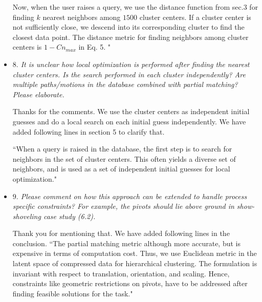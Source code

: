 \documentclass{article}
\begin{document}
\begin{itemize}
Now, when the user raises a query, we use the distance function from sec.3 for finding $k$ nearest neighbors among $1500$ cluster centers.
If a cluster center is not sufficiently close, we descend into its corresponding cluster to find the closest data point.
The distance metric for finding neighbors among cluster centers is $1-Cn_{max}$ in Eq. 5.  "
\\

  \item \emph{
$8.$ It is unclear how local optimization is performed after finding the nearest cluster centers. Is the
search performed in each cluster independently? Are multiple paths/motions in the database
combined with partial matching? Please elaborate.
}

Thanks for the comments.
We use the cluster centers as independent initial guesses and do a local search on each initial guess independently.
We have added following lines in section 5 to clarify that.

``When a query is raised in the database, the first step is to search for neighbors in the set of cluster centers.
This often yields a diverse set of neighbors, and is used as a set of independent initial guesses for local optimization."
\\


  \item \emph{
$9.$ Please comment on how this approach can be extended to handle process specific constraints?
For example, the pivots should lie above ground in show-shoveling case study (6.2).
}

Thank you for mentioning that. We have added following lines in the conclusion.
``The partial matching metric although more accurate, but is expensive in terms of computation cost.
Thus, we use Euclidean metric in the latent space of compressed data for hierarchical clustering.
The formulation is invariant with respect to translation, orientation, and scaling.
Hence, constraints like geometric restrictions on pivots, have to be addressed after finding feasible solutions for the task."

\end{itemize}



\end{document}
